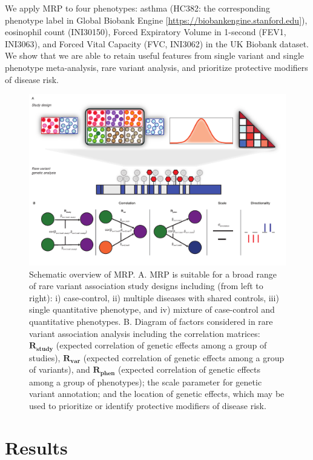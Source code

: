 \documentclass{nature}
\begin{document}
We apply MRP to four phenotypes: asthma (HC382: the corresponding phenotype label in Global Biobank Engine [\url{https://biobankengine.stanford.edu}]), eosinophil count (INI30150), Forced Expiratory Volume in 1-second (FEV1, INI3063), and Forced Vital Capacity (FVC, INI3062) in the UK Biobank dataset. We show that we are able to retain useful features from single variant and single phenotype meta-analysis, rare variant analysis, and prioritize protective modifiers of disease risk. 

\begin{figure}
  \centering
  \includegraphics[width=\textwidth]{../figures/FIG1FINAL.pdf}
  \caption{Schematic overview of MRP. A. MRP is suitable for a broad range of rare variant association study designs including (from left to right): i) case-control, ii) multiple diseases with shared controls, iii) single quantitative phenotype, and iv) mixture of case-control and quantitative phenotypes. B. Diagram of factors considered in rare variant association analysis including the correlation matrices: $\mathbf{R_{\textrm{study}}}$  (expected correlation of genetic effects among a group of studies), $\mathbf{R_{\textrm{var}}}$ (expected correlation of genetic effects among a group of variants), and $\mathbf{R_{\textrm{phen}}}$ (expected correlation of genetic effects among a group of phenotypes); the scale parameter for genetic variant annotation; and the location of genetic effects, which may be used to prioritize or identify protective modifiers of disease risk.}
  \label{Fig1}
  \end{figure}
  

\section{Results}
\end{document}
